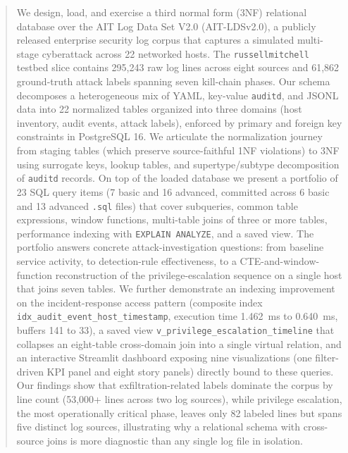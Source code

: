 \begin{abstract}
We design, load, and exercise a third normal form (3NF) relational
database over the AIT Log Data Set V2.0 (AIT-LDSv2.0), a publicly
released enterprise security log corpus that captures a simulated
multi-stage cyberattack across 22 networked hosts. The
\texttt{russellmitchell} testbed slice contains 295{,}243 raw log lines
across eight sources and 61{,}862 ground-truth attack labels spanning
seven kill-chain phases. Our schema decomposes a heterogeneous mix of
YAML, key-value \texttt{auditd}, and JSONL data into 22 normalized
tables organized into three domains (host inventory, audit events,
attack labels), enforced by primary and foreign key constraints in
PostgreSQL 16. We articulate the normalization journey from staging
tables (which preserve source-faithful 1NF violations) to 3NF using
surrogate keys, lookup tables, and supertype/subtype decomposition of
\texttt{auditd} records. On top of the loaded database we present a portfolio of 23 SQL query
items (7 basic and 16 advanced, committed across 6 basic and 13
advanced \texttt{.sql} files) that cover subqueries, common table
expressions, window functions, multi-table joins of three or more
tables, performance indexing with \texttt{EXPLAIN ANALYZE}, and a
saved view. The portfolio answers concrete attack-investigation
questions: from baseline service activity, to detection-rule
effectiveness, to a CTE-and-window-function reconstruction of the
privilege-escalation sequence on a single host that joins seven
tables.
We further demonstrate an indexing improvement on the incident-response
access pattern (composite index
\texttt{idx\_audit\_event\_host\_timestamp}, execution time 1.462~ms to
0.640~ms, buffers 141 to 33), a saved view
\texttt{v\_privilege\_escalation\_timeline} that collapses an
eight-table cross-domain join into a single virtual relation, and an
interactive Streamlit dashboard exposing nine visualizations (one
filter-driven KPI panel and eight story panels) directly bound to
these queries. Our findings show that exfiltration-related labels
dominate the corpus by line count (53{,}000+ lines across two log
sources), while privilege escalation, the most operationally critical
phase, leaves only 82 labeled lines but spans five distinct log
sources, illustrating why a relational schema with cross-source joins
is more diagnostic than any single log file in isolation.
\end{abstract}
